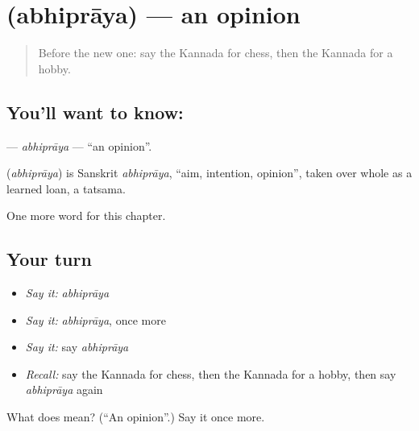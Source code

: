 \section[\texorpdfstring{\kn{ಅಭಿಪ್ರಾಯ} (abhiprāya)}{ಅಭಿಪ್ರಾಯ (abhiprāya)}]{ (abhiprāya) — an opinion}

\label{lesson:KA-C228-abhipraya}



\begin{quote}
Before the new one: say the Kannada for chess, then the Kannada for a hobby.
\end{quote}

\subsection*{You'll want to know: }
\textbf{} — \emph{abhiprāya} — \textquotedblleft{}an opinion\textquotedblright{}.

\begin{cousinweb}
\textbf{} (\emph{abhiprāya}) is Sanskrit \emph{abhiprāya}, \textquotedblleft{}aim, intention, opinion\textquotedblright{}, taken over whole as a learned loan, a tatsama.
\end{cousinweb}

\begin{grammarlens}[title={What you've built}]
One more word for this chapter.
\end{grammarlens}

\subsection*{Your turn}
\begin{itemize}
\raggedright
  \item \emph{Say it:} \emph{abhiprāya}
  \item \emph{Say it:} \emph{abhiprāya}, once more
  \item \emph{Say it:} say \emph{abhiprāya}
  \item \emph{Recall:} say the Kannada for chess, then the Kannada for a hobby, then say \emph{abhiprāya} again
\end{itemize}

\begin{tcolorbox}[breakable,colback=teal!4,colframe=teal!35!black,title={Before you move on}]
What does  mean? (\textquotedblleft{}An opinion\textquotedblright{}.) Say it once more.
\end{tcolorbox}
